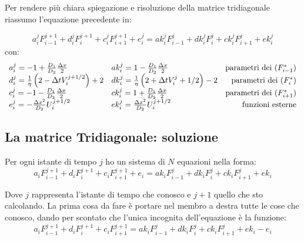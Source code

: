 Per rendere pi\`u chiara spiegazione e risoluzione della matrice tridiagonale riassumo l'equazione precedente in:

\begin{equation}
a_i^j F_{i-1}^{j+1} + d_i^j F^{j+1}_i + c_i^j F_{i+1}^{j+1} + e_i^j = 
ak_i^j F_{i-1}^{j} + dk_i^j F^{j}_i + ck_i^j F_{i+1}^{j} + ek_i^j
\end{equation}
con:
\begin{equation}\label{eq:pararametri}
\begin{array}{ll r}
a_i^j = -1+\frac{D_1}{D_2}\frac{\Delta x}2             & ak_i^j =1-\frac{D_1}{D_2}\frac{\Delta x}2&\text{parametri dei }(F^*_{i-1})\\
d_i^j = \frac1\eta\left( 2-\Delta t V_i^{j+1/2} \right) +2 & dk_i^j = \frac1\eta\left( 2+\Delta tV_i^{j}+1/2 \right) -2 &\text{parametri dei }(F^*_{i})\\
c_i^j = -1-\frac{D_1}{D_2}\frac{\Delta x}2             & ck_i^j =1+\frac{D_1}{D_2}\frac{\Delta x}2&\text{parametri dei }(F^*_{i+1})\\
e_i^j = -\frac{\Delta x^2}{D_2} U_i^{j+1/2}              & ek_i^j =\frac{\Delta x^2}{D_2} U_i^{j+1/2}&\text{funzioni esterne}
\end{array}
\end{equation}
\subsection{La matrice Tridiagonale: soluzione}\label{section:soluzionetri}
Per ogni istante di tempo $j$ ho un sistema di $N$ equazioni nella forma:
\begin{equation}
a_{i} F_{i-1}^{j+1}+d_i F_{i}^{j+1} +c_{i}F_{i+1}^{j+1}  + e_i= 
ak_i F_{i-1}^{j}+ dk_i F_{i}^{j} + ck_i F_{i+1}^{j} + ek_i
\end{equation}

Dove $j$ rappresenta l'istante di tempo che conosco e $j+1$ quello che sto calcolando. La prima cosa da fare \`e portare nel membro a destra tutte le cose che conosco, dando per scontato che l'unica incognita dell'equazione \`e la funzione:
\begin{equation}
a_{i} F_{i-1}^{j+1}+d_i F_{i}^{j+1} +c_{i}F_{i+1}^{j+1}= 
ak_i F_{i-1}^{j}+ dk_i F_{i}^{j} + ck_i F_{i+1}^{j} + ek_i - e_i
\end{equation}

